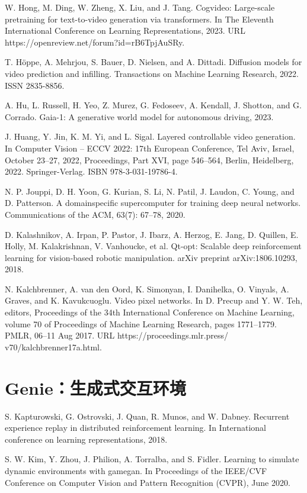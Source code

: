 \documentclass[10pt]{article}
\begin{document}
W. Hong, M. Ding, W. Zheng, X. Liu, and J. Tang. Cogvideo: Large-scale pretraining for text-to-video generation via transformers. In The Eleventh International Conference on Learning Representations, 2023. URL https://openreview.net/forum?id=rB6TpjAuSRy.

T. Höppe, A. Mehrjou, S. Bauer, D. Nielsen, and A. Dittadi. Diffusion models for video prediction and infilling. Transactions on Machine Learning Research, 2022. ISSN 2835-8856.

A. Hu, L. Russell, H. Yeo, Z. Murez, G. Fedoseev, A. Kendall, J. Shotton, and G. Corrado. Gaia-1: A generative world model for autonomous driving, 2023.

J. Huang, Y. Jin, K. M. Yi, and L. Sigal. Layered controllable video generation. In Computer Vision – ECCV 2022: 17th European Conference, Tel Aviv, Israel, October 23–27, 2022, Proceedings, Part XVI, page 546–564, Berlin, Heidelberg, 2022. Springer-Verlag. ISBN 978-3-031-19786-4.

N. P. Jouppi, D. H. Yoon, G. Kurian, S. Li, N. Patil, J. Laudon, C. Young, and D. Patterson. A domainspecific supercomputer for training deep neural networks. Communications of the ACM, 63(7): 67–78, 2020.

D. Kalashnikov, A. Irpan, P. Pastor, J. Ibarz, A. Herzog, E. Jang, D. Quillen, E. Holly, M. Kalakrishnan, V. Vanhoucke, et al. Qt-opt: Scalable deep reinforcement learning for vision-based robotic manipulation. arXiv preprint arXiv:1806.10293, 2018.

N. Kalchbrenner, A. van den Oord, K. Simonyan, I. Danihelka, O. Vinyals, A. Graves, and K. Kavukcuoglu. Video pixel networks. In D. Precup and Y. W. Teh, editors, Proceedings of the 34th International Conference on Machine Learning, volume 70 of Proceedings of Machine Learning Research, pages 1771–1779. PMLR, 06–11 Aug 2017. URL https://proceedings.mlr.press/ v70/kalchbrenner17a.html.

\section*{Genie：生成式交互环境}
S. Kapturowski, G. Ostrovski, J. Quan, R. Munos, and W. Dabney. Recurrent experience replay in distributed reinforcement learning. In International conference on learning representations, 2018.

S. W. Kim, Y. Zhou, J. Philion, A. Torralba, and S. Fidler. Learning to simulate dynamic environments with gamegan. In Proceedings of the IEEE/CVF Conference on Computer Vision and Pattern Recognition (CVPR), June 2020.
\end{document}
